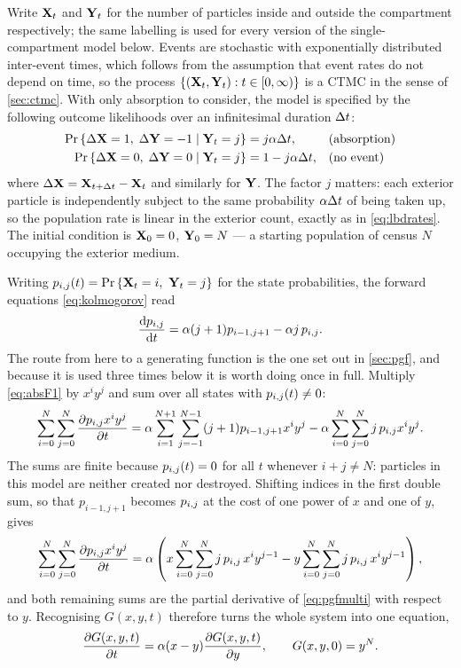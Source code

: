 Write ${{\bf X}_t}$ and ${{\bf Y}_t}$ for the number of particles inside and outside the compartment
respectively; the same labelling is used for every version of the single-compartment model
below. Events are stochastic with exponentially distributed inter-event times, which
follows from the assumption that event rates do not depend on time, so the process
$\{({{\bf X}_t},{{\bf Y}_t}) : t\in[0,\infty)\}$ is a CTMC in the sense of \cref{sec:ctmc}. With only
absorption to consider, the model is specified by the following outcome likelihoods over an
infinitesimal duration $\Delta t$:
\begin{align*}
{\text{Pr}\left\{\Delta{\bf X}=1,\;\Delta{\bf Y}=-1 \;|\; {{\bf Y}_t}=j\right\}} &= j\alpha\Delta t, &&\text{(absorption)}\\
{\text{Pr}\left\{\Delta{\bf X}=0,\;\Delta{\bf Y}=0 \;|\; {{\bf Y}_t}=j\right\}} &= 1-j\alpha\Delta t, &&\text{(no event)}
\end{align*}
where $\Delta{\bf X} = {{\bf X}_{t+\Delta t}}-{{\bf X}_t}$ and similarly for ${\bf Y}$. The factor $j$ matters: each exterior
particle is independently subject to the same probability $\alpha\Delta t$ of being taken up,
so the population rate is linear in the exterior count, exactly as in \cref{eq:lbdrates}.
The initial condition is ${\bf X}_0=0$, ${\bf Y}_0=N$ --- a starting population of census $N$
occupying the exterior medium.

Writing $p_{i,j}(t) = {\text{Pr}\left\{{{\bf X}_t}=i,\ {{\bf Y}_t}=j\right\}}$ for the state probabilities, the forward equations
\cref{eq:kolmogorov} read
\begin{equation}
\label{eq:absF1}
\displaystyle\frac{{\rm d} p_{i,j}}{{\rm d} t} = \alpha(j+1)p_{i-1,j+1} - \alpha j\,p_{i,j} .
\end{equation}
The route from here to a generating function is the one set out in \cref{sec:pgf}, and
because it is used three times below it is worth doing once in full. Multiply
\cref{eq:absF1} by $x^iy^j$ and sum over all states with $p_{i,j}(t)\neq0$:
\begin{equation}
\label{eq:abssum}
\sum_{i=0}^{N}\sum_{j=0}^{N}\displaystyle\frac{\partial p_{i,j} x^iy^j}{\partial t}
= \alpha\sum_{i=1}^{N+1}\sum_{j=-1}^{N-1}(j+1)p_{i-1,j+1}x^iy^j
- \alpha\sum_{i=0}^{N}\sum_{j=0}^{N}j\,p_{i,j} x^iy^j .
\end{equation}
The sums are finite because $p_{i,j}(t)=0$ for all $t$ whenever $i+j\neq N$: particles in this
model are neither created nor destroyed. Shifting indices in the first double sum, so that
$p_{i-1,j+1}$ becomes $p_{i,j}$ at the cost of one power of $x$ and one of $y$, gives
\begin{equation*}
\sum_{i=0}^{N}\sum_{j=0}^{N}\displaystyle\frac{\partial p_{i,j} x^iy^j}{\partial t}
= \alpha\left( x\sum_{i=0}^{N}\sum_{j=0}^{N} j\,p_{i,j}\,x^{i}y^{j-1}
           - y\sum_{i=0}^{N}\sum_{j=0}^{N} j\,p_{i,j}\,x^iy^{j-1}\right),
\end{equation*}
and both remaining sums are the partial derivative of \cref{eq:pgfmulti} with respect to
$y$. Recognising $G(x,y,t)$ therefore turns the whole system into one equation,
\begin{equation}
\label{eq:absPDE1}
\displaystyle\frac{\partial G(x,y,t)}{\partial t} = \alpha(x-y)\displaystyle\frac{\partial G(x,y,t)}{\partial y},
\qquad G(x,y,0) = y^N .
\end{equation}

